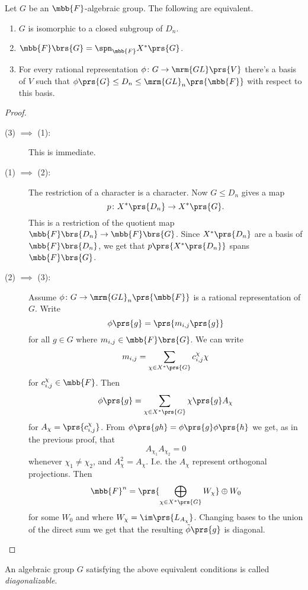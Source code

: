 \documentclass[10pt,a4paper,twoside,openany,hidelinks]{book}
\begin{document}
\begin{proposition}
Let $G$ be an $\mbb{F}$-algebraic group.
The following are equivalent.

\begin{enumerate}
\item $G$ is isomorphic to a closed subgroup of $D_n$.
\item $\mbb{F}\brs{G} = \spn_{\mbb{F}}X^*\prs{G}$.
\item For every rational representation $\phi \colon G \to \mrm{GL}\prs{V}$ there's a basis of $V$ such that $\phi\prs{G} \leq D_n \leq \mrm{GL}_n\prs{\mbb{F}}$ with respect to this basis.
\end{enumerate}
\end{proposition}

\begin{proof}
\begin{description}
\item[(3) $\implies$ (1):]
This is immediate.
\item[(1) $\implies$ (2):]
The restriction of a character is a character. Now $G \leq D_n$ gives a map
\[p \colon X^*\prs{D_n} \to X^*\prs{G} \text{.}\]
This is a restriction of the quotient map $\mbb{F}\brs{D_n} \to \mbb{F}\brs{G}$.
Since $X^*\prs{D_n}$ are a basis of $\mbb{F}\brs{D_n}$, we get that $p\prs{X^*\prs{D_n}}$ spans $\mbb{F}\brs{G}$.
\item[(2) $\implies$ (3):]
Assume $\phi \colon G \to \mrm{GL}_n\prs{\mbb{F}}$ is a rational representation of $G$. Write
\[\phi\prs{g} = \prs{m_{i,j}\prs{g}}\]
for all $g \in G$ where $m_{i,j} \in \mbb{F}\brs{G}$.
We can write
\[m_{i,j} = \sum_{\chi \in X^*\prs{G}} c_{i,j}^{\chi} \chi\]
for $c_{i,j}^{\chi} \in \mbb{F}$.
Then
\[\phi\prs{g} = \sum_{\chi \in X^*\prs{G}} \chi\prs{g} A_\chi\]
for $A_\chi = \prs{c_{i,j}^\chi}$.
From $\phi\prs{gh} = \phi\prs{g} \phi\prs{h}$ we get, as in the previous proof, that
\[A_{\chi_1} A_{\chi_2} = 0\]
whenever $\chi_1 \neq \chi_2$, and $A_{\chi}^2 = A_\chi$.
I.e. the $A_\chi$ represent orthogonal projections.
Then
\[\mbb{F}^n = \prs{\bigoplus_{\chi \in X^*\prs{G}} W_\chi} \oplus W_0\]
for some $W_0$ and where $W_\chi = \im\prs{L_{A_\chi}}$.
Changing bases to the union of the direct sum we get that the resulting $\tilde{\phi}\prs{g}$ is diagonal.
\end{description}
\end{proof}

\begin{definition}
An algebraic group $G$ satisfying the above equivalent conditions is called \emph{diagonalizable}.
\end{definition}
\end{document}
